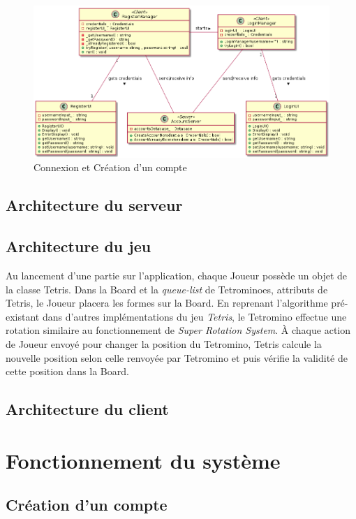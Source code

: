 \documentclass{article}
\begin{document}
\begin{figure}[!h]
    \centering
    \includegraphics[width=1\textwidth]{uml/class/connexion/Connexion.png}
    \caption{Connexion et Création d'un compte}
    \label{fig:Royal-Competition}
\end{figure}

\subsection{Architecture du serveur}

\subsection{Architecture du jeu}

Au lancement d'une partie sur l'application, chaque Joueur possède un objet de la classe Tetris. Dans la Board et la \textit{queue-list} de Tetrominoes, attributs de Tetris, le Joueur placera les formes sur la Board. En reprenant l'algorithme pré-existant dans d'autres implémentations du jeu \textit{Tetris}, le Tetromino effectue une rotation similaire au fonctionnement de \textit{Super Rotation System}. À chaque action de Joueur envoyé pour changer la position du Tetromino, Tetris calcule la nouvelle position selon celle renvoyée par Tetromino et puis vérifie la validité de cette position dans la Board. 


\subsection{Architecture du client}

\section{Fonctionnement du système}

\subsection{Création d'un compte}
\end{document}
